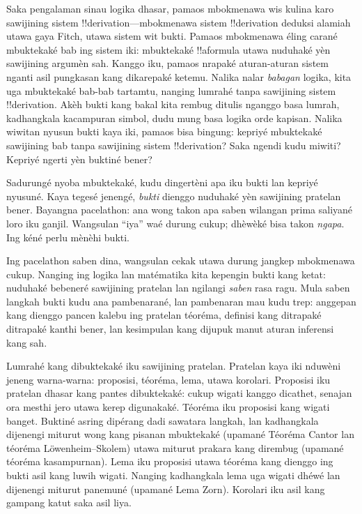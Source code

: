\documentclass[../../../include/open-logic-section]{subfiles}
\begin{document}


Saka pengalaman sinau logika dhasar, pamaos mbokmenawa wis
kulina karo sawijining sistem !!{derivation}---mbokmenawa sistem
!!{derivation} deduksi alamiah utawa gaya Fitch, utawa sistem wit
bukti. Pamaos mbokmenawa éling carané mbuktekaké bab ing sistem
iki: mbuktekaké !!a{formula} utawa nuduhaké yèn sawijining argumèn
sah. Kanggo iku, pamaos nrapaké aturan-aturan sistem nganti
asil pungkasan kang dikarepaké ketemu. Nalika nalar \emph{babagan}
logika, kita uga mbuktekaké bab-bab tartamtu, nanging lumrahé tanpa
sawijining sistem !!{derivation}. Akèh bukti kang bakal kita rembug ditulis
nganggo basa lumrah, kadhangkala kacampuran simbol, dudu mung basa
logika orde kapisan. Nalika wiwitan nyusun bukti kaya iki,
pamaos bisa bingung: kepriyé mbuktekaké sawijining bab tanpa
sawijining sistem !!{derivation}? Saka ngendi kudu miwiti? Kepriyé ngerti
yèn buktiné bener?

Sadurungé nyoba mbuktekaké, kudu dingertèni apa iku bukti lan
kepriyé nyusuné. Kaya tegesé jenengé, \emph{bukti} dienggo
nuduhaké yèn sawijining pratelan bener. Bayangna pacelathon:
ana wong takon apa saben wilangan prima saliyané loro iku ganjil.
Wangsulan ``iya'' waé durung cukup; dhèwèké bisa takon
\emph{ngapa}. Ing kéné perlu mènèhi bukti.

Ing pacelathon saben dina, wangsulan cekak utawa durung jangkep
mbokmenawa cukup. Nanging ing logika lan matématika kita kepengin
bukti kang ketat: nuduhaké bebeneré sawijining pratelan lan
ngilangi \emph{saben} rasa ragu. Mula saben langkah bukti kudu ana
pambenarané, lan pambenaran mau kudu trep: anggepan kang dienggo
pancen kalebu ing pratelan téoréma, definisi kang ditrapaké
ditrapaké kanthi bener, lan kesimpulan kang dijupuk manut aturan
inferensi kang sah.

Lumrahé kang dibuktekaké iku sawijining pratelan. Pratelan kaya iki
nduwèni jeneng warna-warna: proposisi, téoréma, lema, utawa korolari.
Proposisi iku pratelan dhasar kang pantes dibuktekaké: cukup wigati
kanggo dicathet, senajan ora mesthi jero utawa kerep digunakaké.
Téoréma iku proposisi kang wigati banget. Buktiné asring dipérang
dadi sawatara langkah, lan kadhangkala dijenengi miturut wong kang
pisanan mbuktekaké (upamané Téoréma Cantor lan téoréma
L\"owenheim--Skolem) utawa miturut prakara kang dirembug
(upamané téoréma kasampurnan). Lema iku proposisi utawa téoréma
kang dienggo ing bukti asil kang luwih wigati. Nanging kadhangkala
lema uga wigati dhéwé lan dijenengi miturut panemuné
(upamané Lema Zorn). Korolari iku asil kang gampang katut saka
asil liya.
\end{document}
